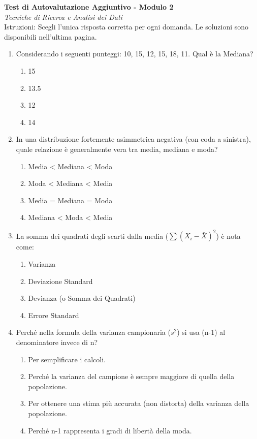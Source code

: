 \documentclass[12pt, a4paper]{article}
\begin{document}
\begin{center}
    \Large\textbf{Test di Autovalutazione Aggiuntivo - Modulo 2} \\
    \vspace{0.2cm}
    \large\textit{Tecniche di Ricerca e Analisi dei Dati} \\
    \vspace{0.5cm}
    \normalsize{Istruzioni: Scegli l'unica risposta corretta per ogni domanda. Le soluzioni sono disponibili nell'ultima pagina.}
\end{center}
\vspace{1cm}

\begin{enumerate} %
    \item Considerando i seguenti punteggi: 10, 15, 12, 15, 18, 11. Qual è la Mediana?
    \begin{enumerate} %
        \item 15
        \item 13.5
        \item 12
        \item 14
    \end{enumerate}

    \item In una distribuzione fortemente asimmetrica negativa (con coda a sinistra), quale relazione è generalmente vera tra media, mediana e moda?
    \begin{enumerate}
        \item Media < Mediana < Moda
        \item Moda < Mediana < Media
        \item Media = Mediana = Moda
        \item Mediana < Moda < Media
    \end{enumerate}

    \item La somma dei quadrati degli scarti dalla media ($\sum (X_i - \bar{X})^2$) è nota come:
    \begin{enumerate}
        \item Varianza
        \item Deviazione Standard
        \item Devianza (o Somma dei Quadrati)
        \item Errore Standard
    \end{enumerate}

    \item Perché nella formula della varianza campionaria ($s^2$) si usa (n-1) al denominatore invece di n?
    \begin{enumerate}
        \item Per semplificare i calcoli.
        \item Perché la varianza del campione è sempre maggiore di quella della popolazione.
        \item Per ottenere una stima più accurata (non distorta) della varianza della popolazione.
        \item Perché n-1 rappresenta i gradi di libertà della moda.
    \end{enumerate}


\end{enumerate}
\end{document}
